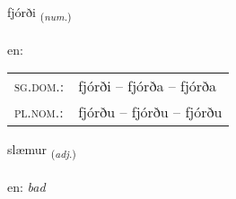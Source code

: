 \documentclass[frontgrid, backgrid]{flacards}\usepackage[]{graphicx}\usepackage[]{color}
\begin{document}
\renewcommand{\flhead}{\vskip5pt \fboxsep=0pt {\small\bfseries\footnotesize Töluorð | Numeral}}
\renewcommand{\fcfoot}{\vskip5pt \fboxsep=0pt \hspace{2pt}{\small\bfseries\footnotesize 2K}}

\renewcommand{\blhead}{\vskip5pt {\small\bfseries\footnotesize Töluorð | Numeral }}
\renewcommand{\bcfoot}{\vskip5pt \hspace{2pt}{\small\bfseries\footnotesize 2K}}


{fjórði \small{\textsubscript{(\textit{num.})}} \\[1ex] %
\textphonetic{[fjourðɪ]} \\
en: \emph{} \\  [2ex]
\renewcommand*{\arraystretch}{0.8}
\begin{tabular}{ll}
\textsc{sg.dom.}: & fjórði  --  fjórða -- fjórða \\ 
\textsc{pl.nom.}: & fjórðu -- fjórðu -- fjórðu
\end{tabular}
}

\renewcommand{\flhead}{\vskip5pt \fboxsep=0pt {\small\bfseries\footnotesize Lýsingarorð | Adjective}}
\renewcommand{\fcfoot}{\vskip5pt \fboxsep=0pt \hspace{2pt}{\small\bfseries\footnotesize 2K}}

\renewcommand{\blhead}{\vskip5pt {\small\bfseries\footnotesize Lýsingarorð | Adjective }}
\renewcommand{\bcfoot}{\vskip5pt \hspace{2pt}{\small\bfseries\footnotesize 2K}}


{slæmur \small{\textsubscript{(\textit{adj.})}} \\[1ex] %
\textphonetic{[stlaiːmʏr]} \\
en: \emph{bad} \\  [2ex]
\renewcommand*{\arraystretch}{0.8}
}
\end{document}
